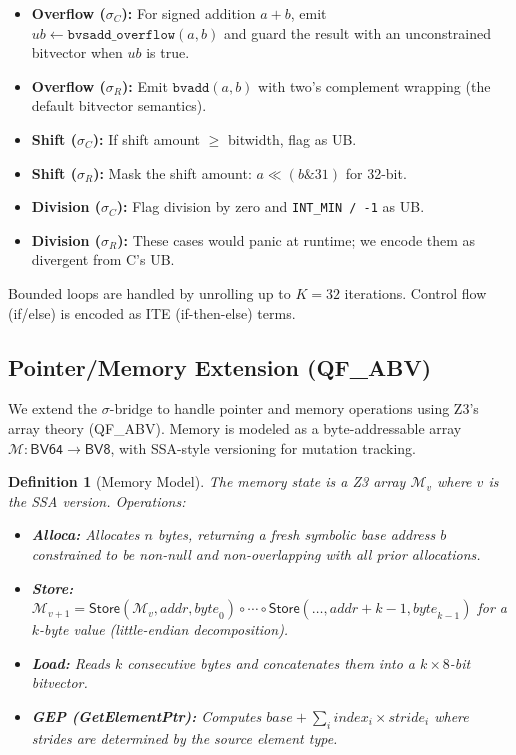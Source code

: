 \documentclass[11pt]{article}
\newtheorem{definition}[theorem]{Definition}
\newcommand{\sigbridge}{$\sigma$-bridge}
\begin{document}
\begin{itemize}[leftmargin=*,nosep]
\item \textbf{Overflow ($\sigma_C$):} For signed addition $a + b$, emit
      $\mathit{ub} \leftarrow \texttt{bvsadd\_overflow}(a,b)$ and guard the
      result with an unconstrained bitvector when $\mathit{ub}$ is true.
\item \textbf{Overflow ($\sigma_R$):} Emit $\texttt{bvadd}(a,b)$ with
      two's complement wrapping (the default bitvector semantics).
\item \textbf{Shift ($\sigma_C$):} If shift amount $\geq$ bitwidth,
      flag as UB.
\item \textbf{Shift ($\sigma_R$):} Mask the shift amount:
      $a \ll (b \mathbin{\&} 31)$ for 32-bit.
\item \textbf{Division ($\sigma_C$):} Flag division by zero and
      \texttt{INT\_MIN / -1} as UB.
\item \textbf{Division ($\sigma_R$):} These cases would panic at runtime;
      we encode them as divergent from C's UB.
\end{itemize}

Bounded loops are handled by unrolling up to $K = 32$ iterations.
Control flow (if/else) is encoded as ITE (if-then-else) terms.

\subsection{Pointer/Memory Extension (QF\_ABV)}\label{sec:memory}

We extend the \sigbridge{} to handle pointer and memory operations using
Z3's array theory (QF\_ABV).  Memory is modeled as a byte-addressable
array $\mathcal{M} : \textsf{BV64} \to \textsf{BV8}$, with SSA-style
versioning for mutation tracking.

\begin{definition}[Memory Model]\label{def:memory}
The memory state is a Z3 array $\mathcal{M}_v$ where $v$ is the SSA
version.  Operations:
\begin{itemize}[nosep,leftmargin=*]
\item \textbf{Alloca:} Allocates $n$ bytes, returning a fresh symbolic
      base address $b$ constrained to be non-null and non-overlapping
      with all prior allocations.
\item \textbf{Store:} $\mathcal{M}_{v+1} = \mathsf{Store}(\mathcal{M}_v,
      \mathit{addr}, \mathit{byte}_0) \circ \cdots \circ
      \mathsf{Store}(\ldots, \mathit{addr}+k-1, \mathit{byte}_{k-1})$
      for a $k$-byte value (little-endian decomposition).
\item \textbf{Load:} Reads $k$ consecutive bytes and concatenates them
      into a $k \times 8$-bit bitvector.
\item \textbf{GEP (GetElementPtr):} Computes
      $\mathit{base} + \sum_i \mathit{index}_i \times \mathit{stride}_i$
      where strides are determined by the source element type.
\end{itemize}
\end{definition}
\end{document}
